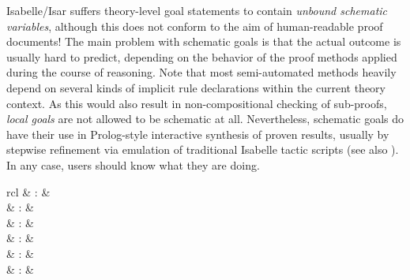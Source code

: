 \begin{isabellebody}
\begin{isamarkuptext}
  \medskip

  \begin{warn}
    Isabelle/Isar suffers theory-level goal statements to contain
    \emph{unbound schematic variables}, although this does not conform
    to the aim of human-readable proof documents!  The main problem
    with schematic goals is that the actual outcome is usually hard to
    predict, depending on the behavior of the proof methods applied
    during the course of reasoning.  Note that most semi-automated
    methods heavily depend on several kinds of implicit rule
    declarations within the current theory context.  As this would
    also result in non-compositional checking of sub-proofs,
    \emph{local goals} are not allowed to be schematic at all.
    Nevertheless, schematic goals do have their use in Prolog-style
    interactive synthesis of proven results, usually by stepwise
    refinement via emulation of traditional Isabelle tactic scripts
    (see also ).  In any case, users
    should know what they are doing.
  \end{warn}%
\end{isamarkuptext}%
\isamarkuptrue%
%
\isamarkuptrue%
%
\begin{isamarkuptext}%
\begin{matharray}{rcl}
    \hypertarget{command.proof}{\hyperlink{command.proof}{\mbox{}}} & : &  \\
    \hypertarget{command.qed}{\hyperlink{command.qed}{\mbox{}}} & : &  \\
    \hypertarget{command.by}{\hyperlink{command.by}{\mbox{}}} & : &  \\
    \hypertarget{command.ddot}{\hyperlink{command.ddot}{\mbox{\isa{\isacommand{{\isachardot}{\isachardot}}}}}} & : &  \\
    \hypertarget{command.dot}{\hyperlink{command.dot}{\mbox{\isa{\isacommand{{\isachardot}}}}}} & : &  \\
    \hypertarget{command.sorry}{\hyperlink{command.sorry}{\mbox{}}} & : &  \\
  \end{matharray}


\end{isamarkuptext}
\end{isabellebody}
